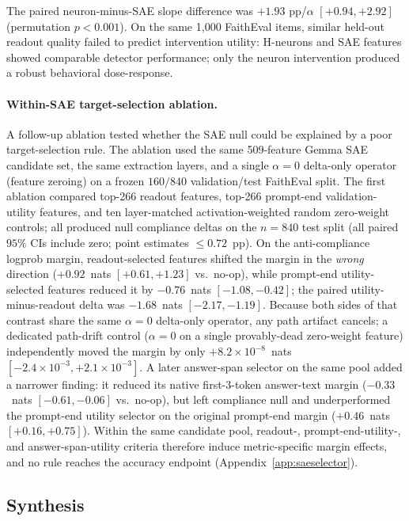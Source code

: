 \documentclass{article}
\begin{document}
The paired neuron-minus-SAE slope difference was $+1.93$ pp/$\alpha$ $[+0.94, +2.92]$ (permutation $p < 0.001$).
On the same 1,000 FaithEval items, similar held-out readout quality failed to predict intervention utility: H-neurons and SAE features showed comparable detector performance; only the neuron intervention produced a robust behavioral dose-response.

\paragraph{Within-SAE target-selection ablation.}
A follow-up ablation tested whether the SAE null could be explained by a poor target-selection rule.
The ablation used the same 509-feature Gemma SAE candidate set, the same extraction layers, and a single $\alpha = 0$ delta-only operator (feature zeroing) on a frozen $160/840$ validation/test FaithEval split.
The first ablation compared top-266 readout features, top-266 prompt-end validation-utility features, and ten layer-matched activation-weighted random zero-weight controls; all produced null compliance deltas on the $n = 840$ test split (all paired $95\%$ CIs include zero; point estimates $\le 0.72$~pp).
On the anti-compliance logprob margin, readout-selected features shifted the margin in the \emph{wrong} direction (+$0.92$~nats $[+0.61, +1.23]$ vs.\ no-op), while prompt-end utility-selected features reduced it by $-0.76$~nats $[-1.08, -0.42]$; the paired utility-minus-readout delta was $-1.68$~nats $[-2.17, -1.19]$.
Because both sides of that contrast share the same $\alpha = 0$ delta-only operator, any path artifact cancels; a dedicated path-drift control ($\alpha = 0$ on a single provably-dead zero-weight feature) independently moved the margin by only $+8.2\times 10^{-8}$~nats $[-2.4\times10^{-3}, +2.1\times10^{-3}]$.
A later answer-span selector on the same pool added a narrower finding: it reduced its native first-3-token answer-text margin ($-0.33$~nats $[-0.61, -0.06]$ vs.\ no-op), but left compliance null and underperformed the prompt-end utility selector on the original prompt-end margin ($+0.46$~nats $[+0.16, +0.75]$).
Within the same candidate pool, readout-, prompt-end-utility-, and answer-span-utility criteria therefore induce metric-specific margin effects, and no rule reaches the accuracy endpoint (Appendix~\ref{app:saeselector}).

\subsection{Synthesis}
\end{document}

